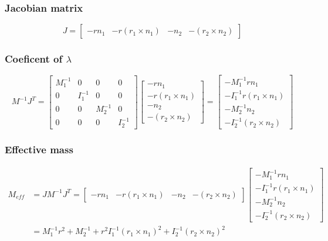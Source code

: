 \documentclass{article}
\begin{document}
		\subsubsection{Jacobian matrix}
		$$
		J =
			\begin{bmatrix}
				-rn_1 & -r(r_1 \times n_1) & -n_2 & -(r_2 \times n_2)	
			\end{bmatrix}
		$$
		\subsubsection{Coeficent of $\lambda$}
		$$
		M^{-1}J^T=	
		\begin{bmatrix}
			M_1^{-1} 	& 0 		& 0 		& 0\\
			0 			& I_1^{-1} 	& 0 		& 0\\
			0 			& 0 		& M_2^{-1} 	& 0\\
			0 			& 0 		& 0 		& I_2^{-1}
		\end{bmatrix}
		\begin{bmatrix}
			-rn_1\\
			-r(r_1 \times n_1)\\
			-n_2\\
			-(r_2 \times n_2)
		\end{bmatrix}
		=
		\begin{bmatrix}
			-M_1^{-1}rn_1\\
			-I_1^{-1}r(r_1 \times n_1)\\
			-M_2^{-1}n_2\\
			-I_2^{-1}(r_2 \times n_2)
		\end{bmatrix}
		$$
		\subsubsection{Effective mass}
		\begin{align*}
			M_{eff}	&= JM^{-1}J^T =
				\begin{bmatrix}
					-rn_1 & -r(r_1 \times n_1) & -n_2 & -(r_2 \times n_2)
				\end{bmatrix}
				\begin{bmatrix}
					-M_1^{-1}rn_1\\
					-I_1^{-1}r(r_1 \times n_1)\\
					-M_2^{-1}n_2\\
					-I_2^{-1}(r_2 \times n_2)
				\end{bmatrix}\\
			&= M_1^{-1}r^2 + M_2^{-1} + r^2I_1^{-1}(r_1 \times n_1)^2 + I_2^{-1}(r_2 \times n_2)^2
		\end{align*}
\end{document}
